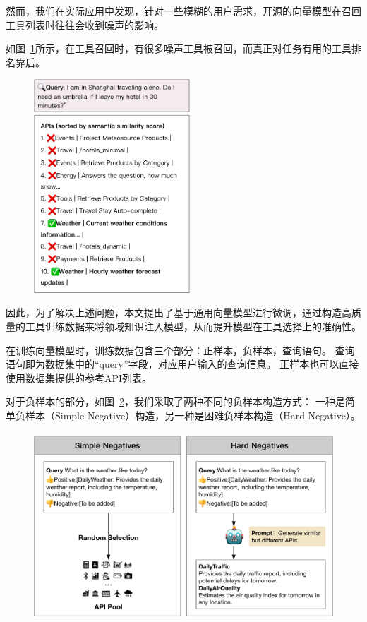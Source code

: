 然而，我们在实际应用中发现，针对一些模糊的用户需求，开源的向量模型在召回工具列表时往往会收到噪声的影响。

如图~\ref{fig:why-tune}所示，在工具召回时，有很多噪声工具被召回，而真正对任务有用的工具排名靠后。

\begin{figure}[!htp]
  \vspace{1em}
  \centering
  \setlength{\abovecaptionskip}{10pt} %
  \includegraphics[height=8cm]{../assets/ch3-为何需要微调.pdf}
  \label{fig:why-tune}
\end{figure}

因此，为了解决上述问题，本文提出了基于通用向量模型进行微调，通过构造高质量的工具训练数据来将领域知识注入模型，从而提升模型在工具选择上的准确性。

在训练向量模型时，训练数据包含三个部分：正样本，负样本，查询语句。
查询语句即为数据集中的“query”字段，对应用户输入的查询信息。
正样本也可以直接使用数据集提供的参考API列表。

对于负样本的部分，如图~\ref{fig:negative-sample-generation}，我们采取了两种不同的负样本构造方式：
一种是简单负样本（Simple Negative）构造，另一种是困难负样本构造（Hard Negative）。

\begin{figure}[!htp]
  \vspace{1em}
  \centering
  \setlength{\abovecaptionskip}{10pt} %
  \includegraphics[height=7cm]{../assets/ch3-负样本构造.pdf}
  \label{fig:negative-sample-generation}
\end{figure}


